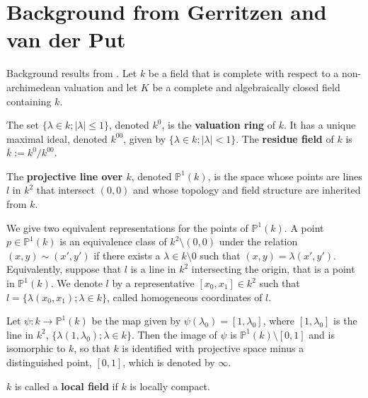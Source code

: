 \section*{Background from Gerritzen and van der Put}

Background results from \cite{gvdp}. Let $k$ be a field that is complete with respect to a non-archimedean valuation and let $K$ be a complete and algebraically closed field containing $k$. 
\begin{definition*}\cite{gvdp}
	The set $\{\lambda \in k; \mid \lambda\mid \leq 1\}$, denoted $k^0$, is the \textbf{valuation ring} of $k$. It has a unique maximal ideal, denoted $k^{00}$, given by $\{\lambda \in k; \mid \lambda\mid < 1\}$. The \textbf{residue field} of $k$ is $\bar{k} := k^0/k^{00}$.
\end{definition*}


\begin{definition*}\cite{gvdp} The \textbf{projective line over $k$}, denoted $\mathbb{P}^1(k)$, is the space whose points are lines $l$ in $k^2$ that intersect $(0,0)$ and whose topology and field structure are inherited from $k$. 
\end{definition*}

We give two equivalent representations for the points of $\mathbb{P}^1(k)$. A point $p \in \mathbb{P}^1(k)$ is an equivalence class of $k^2 \setminus (0,0)$ under the relation $(x,y) \sim (x',y')$ if there exists a $\lambda \in k\setminus 0$ such that  $(x,y) = \lambda(x',y')$. Equivalently, suppose that $l$ is a line in $k^2$ intersecting the origin, that is a point in $\mathbb{P}^1(k)$. We denote $l$ by a representative $[x_0, x_1] \in k^2$ such that $l = \{\lambda (x_0, x_1 ); \lambda \in k\}$, called homogeneous coordinates of $l$.



\begin{proposition*} \cite{gvdp} Let $\psi: k \rightarrow \mathbb{P}^1(k)$ be the map given by $\psi(\lambda_0) = [1, \lambda_0]$, where $ [1, \lambda_0]$ is the line in $k^2$, $\{\lambda(1, \lambda_0); \lambda \in k\}$. Then the image of $\psi$ is $\mathbb{P}^1(k) \setminus [0,1]$ and is isomorphic to $k$, so that $k$ is identified with projective space minus a distinguished point, $[0,1]$, which is denoted by $\infty$.  
\end{proposition*}

\begin{definition*}\cite{gvdp} $k$ is called a \textbf{local field} if $k$ is locally compact. \end{definition*}

